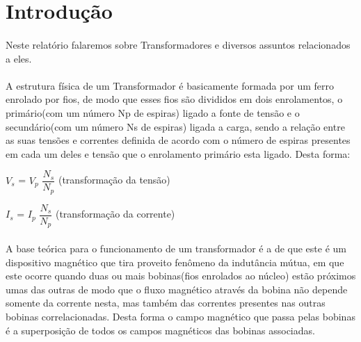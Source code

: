 \documentclass[a4paper, 12pt]{article}
\begin{document}
\newpage
{}
\section{Introdução}

\paragraph{}Neste relatório falaremos sobre Transformadores e diversos assuntos relacionados a eles.

\paragraph{}A estrutura física de um Transformador é basicamente formada por um ferro enrolado por fios, de modo que esses fios são divididos em dois enrolamentos, o primário(com um número Np de espiras) ligado a fonte de tensão e o secundário(com um número Ns de espiras) ligada a carga, sendo a relação entre as suas tensões e correntes definida de acordo com o número de espiras presentes em cada um deles e tensão que o enrolamento primário esta ligado. Desta forma:\\

\begin{mdframed}[backgroundcolor=gray!20]
\begin{center}
		$V_s$ = $V_p$ $\dfrac{N_s}{N_p}$ (transformação da tensão)
			\end{center}
    \begin{center}
		$I_s$ = $I_p$ $\dfrac{N_s}{N_p}$ (transformação da corrente)
			\end{center}
\end{mdframed}
	

\paragraph{}A base teórica para o funcionamento de um transformador é a de que este é um dispositivo magnético que tira proveito fenômeno da indutância mútua, em que este ocorre quando duas ou mais bobinas(fios enrolados ao núcleo) estão próximos umas das outras de modo que o fluxo magnético através da bobina não depende somente da corrente nesta, mas também das correntes presentes nas outras bobinas correlacionadas. Desta forma o campo magnético que passa pelas bobinas é a superposição de todos os campos magnéticos das bobinas associadas. \\
\newpage
\end{document}
